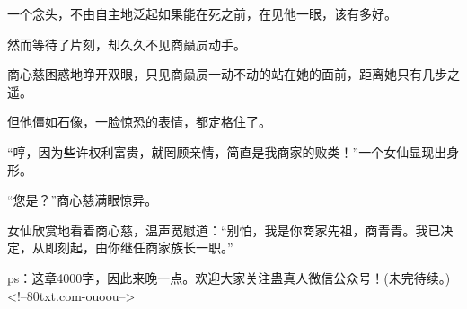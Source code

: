 \begin{this_body}
一个念头，不由自主地泛起如果能在死之前，在见他一眼，该有多好。

然而等待了片刻，却久久不见商赑屃动手。

商心慈困惑地睁开双眼，只见商赑屃一动不动的站在她的面前，距离她只有几步之遥。

但他僵如石像，一脸惊恐的表情，都定格住了。

“哼，因为些许权利富贵，就罔顾亲情，简直是我商家的败类！”一个女仙显现出身形。

“您是？”商心慈满眼惊异。

女仙欣赏地看着商心慈，温声宽慰道：“别怕，我是你商家先祖，商青青。我已决定，从即刻起，由你继任商家族长一职。”

ps：这章4000字，因此来晚一点。欢迎大家关注蛊真人微信公众号！(未完待续。)<!--80txt.com-ouoou-->

\end{this_body}


